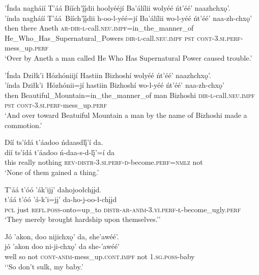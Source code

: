 \ea\label{ex:text2-24-3}
’Índa nagháíí T’áá Bíích’į́į́dii hoolyééjí Ba’álílii wolyéé ńt’éé’ naazhchxǫ’.\\
\gll ’índa	nagháíí	T’áá~{Bíích’į́į́dii}	h-oo-l-yéé=jí	Ba’álílii	wo-l-yéé	ńt’éé’	naa-zh-chxǫ’\\
     then	there	Aneth	\textsc{ar}-\textsc{dir}-\textsc{l}-call.\textsc{neu}.\textsc{impf}=in\_the\_manner\_of	He\_Who\_Has\_Supernatural\_Powers	\textsc{dir}-\textsc{l}-call.\textsc{neu}.\textsc{impf}	\textsc{pst}	\textsc{cont}-3.\textsc{si}.\textsc{perf}-mess\_up.\textsc{perf}\\
\glt `Over by Aneth a man called He Who Has Supernatural Power caused trouble.'
\z

\ea\label{ex:text2-24-4}
’Índa Dziłk’i Hózhóniijí Hastiin Bizhoshí wolyéé ńt’éé’ naazhchxǫ’.\\
\gll ’índa	Dziłk’i~{Hózhónii=jí}	hastiin	Bizhoshí	wo-l-yéé	ńt’éé’	naa-zh-chxǫ’\\
     then	Beautiful\_Mountain=in\_the\_manner\_of	man	Bizhoshi	\textsc{dir}-\textsc{l}-call.\textsc{neu}.\textsc{impf}	\textsc{pst}	\textsc{cont}-3.\textsc{si}.\textsc{perf}-mess\_up.\textsc{perf}\\
\glt `And over toward Beatuiful Mountain a man by the name of Bizhoshi made a commotion.'
\z

\ea\label{ex:text2-24-5}
Díí ts’ídá t’áadoo ńdaasdlį́’í da.\\
\gll díí	ts’ídá	t’áadoo	ń-daa-s-d-lį́’=í	da\\
     this	really	nothing	\textsc{rev}-\textsc{distr}-3.\textsc{si}.\textsc{perf}-\textsc{d}-become.\textsc{perf}=\textsc{nmlz}	not\\
\glt `None of them gained a thing.'
\z

\ea\label{ex:text2-24-6}
T’áá t’óó ’ák’ijį’ dahojoołchįįd.\\
\gll t’áá	t’óó	’á-k’i=jį’	da-ho-j-oo-ł-chįįd\\
     \textsc{pcl}	just	\textsc{refl}.\textsc{poss}-onto=up\_to	\textsc{distr}-\textsc{ar}-\textsc{anim}-3.\textsc{yi}.\textsc{perf}-\textsc{ł}-become\_ugly.\textsc{perf}\\
\glt `They merely brought hardship upon themselves.'{'}
\z

\ea\label{ex:text2-24-7}
Jó ’akon, doo nijichxǫ’ da, she’awéé’.\\
\gll jó	’akon	doo	ni-ji-chxǫ’	da	she-’awéé’\\
     well	so	not	\textsc{cont}-\textsc{anim}-mess\_up.\textsc{cont}.\textsc{impf}	not	1.\textsc{sg}.\textsc{poss}-baby\\
\glt `{`}So don't sulk, my baby.'
\z

